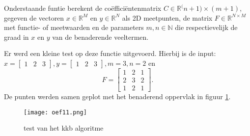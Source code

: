 Onderstaande funtie berekent de co\"effici\"entenmatrix $C \in \mathbb{R}^({n+1) \times (m+1)}$, gegeven de vectoren $x \in \mathbb{R}^{M}$ en $y \in \mathbb{R}^{N}$ als 2D meetpunten, de matrix $F \in \mathbb{R}^{N \times M}$ met functie- of meetwaarden en de parameters $m,n \in \mathbb{N}$ die respectievelijk de graad in $x$ en $y$ van de benaderende veeltermen.


Er werd een kleine test op deze functie uitgevoerd. Hierbij is de input: $x = \begin{bmatrix}1&2&3\end{bmatrix}, y = \begin{bmatrix}1&2&3\end{bmatrix}, m = 3, n = 2$ en
$$F = \begin{bmatrix}1&2&1\\
2&3&2\\
1&2&1\end{bmatrix}.$$
De punten werden samen geplot met het benaderend oppervlak in figuur \ref{fig:oef11}.

\begin{figure}[htb]
    \centering
    \texttt{[image: oef11.png]}
    \caption{test van het kkb algoritme}
    \label{fig:oef11}
\end{figure}